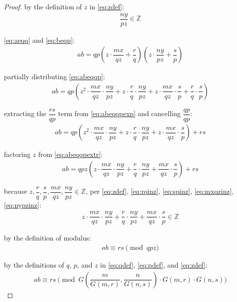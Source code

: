 \documentclass{article}
\begin{document}
\begin{proof}
by the definition of ${z}$ in \eqref{eq:zdef}:
\begin{align}
  &\dfrac{{n}{y}}{{p}{z}} \in \mathbb{Z} \label{eq:nypzinz}
\end{align}

\eqref{eq:aeqq} and \eqref{eq:beqp}:
\begin{align}
  &{a}{b} = {q}{p}\left({z} \cdot \dfrac{{m}{x}}{{q}{z}} +
    \dfrac{{r}}{{q}}\right)\left({z} \cdot \dfrac{{n}{y}}{{p}{z}} +
    \dfrac{{s}}{{p}}\right) \label{eq:abeqqp}
\end{align}

partially distributing \eqref{eq:abeqqp}:
\begin{align}
  &{a}{b} = {q}{p}\left({z}^2 \cdot \dfrac{{m}{x}}{{q}{z}} \cdot
    \dfrac{{n}{y}}{{p}{z}} + {z} \cdot \dfrac{{r}}{{q}} \cdot
    \dfrac{{n}{y}}{{p}{z}} + {z} \cdot \dfrac{{m}{x}}{{q}{z}} \cdot
    \dfrac{{s}}{{p}} + \dfrac{{r}}{{q}} \cdot \dfrac{{s}}{{p}}\right) \label{eq:abeqqpexp}
\end{align}

extracting the $\dfrac{{r}{s}}{{q}{p}}$ term from \eqref{eq:abeqqpexp} and cancelling $\dfrac{{q}{p}}{{q}{p}}$:
\begin{align}
  &{a}{b} = {q}{p}\left({z}^2 \cdot \dfrac{{m}{x}}{{q}{z}} \cdot
    \dfrac{{n}{y}}{{p}{z}} + {z} \cdot \dfrac{{r}}{{q}} \cdot
    \dfrac{{n}{y}}{{p}{z}} + {z} \cdot \dfrac{{m}{x}}{{q}{z}} \cdot
    \dfrac{{s}}{{p}}\right) + {r}{s} \label{eq:abeqqpextr}
\end{align}

factoring ${z}$ from \eqref{eq:abeqqpextr}:
\begin{align}
  &{a}{b} = {q}{p}{z}\left({z} \cdot \dfrac{{m}{x}}{{q}{z}} \cdot
    \dfrac{{n}{y}}{{p}{z}} + \dfrac{{r}}{{q}} \cdot \dfrac{{n}{y}}{{p}{z}} +
    \dfrac{{m}{x}}{{q}{z}} \cdot \dfrac{{s}}{{p}}\right) + {r}{s}
\end{align}

because ${z}, \dfrac{{r}}{q}, \dfrac{{s}}{{p}}, \dfrac{{m}{x}}{{q}{z}},
  \dfrac{{n}{y}}{{p}{z}} \in \mathbb{Z}$, per \eqref{eq:zdef}, \eqref{eq:rqinz}, \eqref{eq:spinz}, \eqref{eq:mxqzinz}, \eqref{eq:nypzinz}:
\begin{align}
  &{z} \cdot \dfrac{{m}{x}}{{q}{z}} \cdot \dfrac{{n}{y}}{{p}{z}} +
    \dfrac{{r}}{{q}} \cdot \dfrac{{n}{y}}{{p}{z}} + \dfrac{{m}{x}}{{q}{z}} \cdot
    \dfrac{{s}}{{p}} \in \mathbb{Z}
\end{align}

by the definition of modulus:
\begin{align}
  &{a}{b} \equiv {r}{s} \pmod{{q}{p}{z}}
\end{align}

by the definitions of ${q}$, ${p}$, and ${z}$ in \eqref{eq:qdef}, \eqref{eq:pdef}, and \eqref{eq:zdef}:
\begin{align}
  &{a}{b} \equiv {r}{s} \pmod{G\left(\dfrac{{m}}{G\left({m}, {r}\right)},
    \dfrac{{n}}{G\left({n}, {s}\right)}\right) \cdot G\left({m}, {r}\right)
    \cdot G\left({n}, {s}\right)}
\end{align}

\end{proof}
\end{document}
